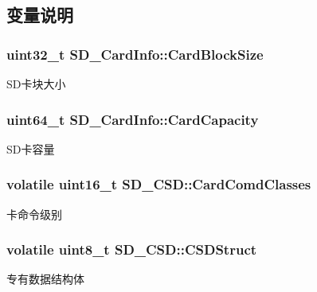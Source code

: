\subsection{变量说明}
\subsubsection[{\texorpdfstring{Card\+Block\+Size}{CardBlockSize}}]{\setlength{\rightskip}{0pt plus 5cm}uint32\+\_\+t S\+D\+\_\+\+Card\+Info\+::\+Card\+Block\+Size}\hypertarget{group__sd__card_ga610fdab86929f0fc26881d564b19d609}{}\label{group__sd__card_ga610fdab86929f0fc26881d564b19d609}
S\+D卡块大小 
\subsubsection[{\texorpdfstring{Card\+Capacity}{CardCapacity}}]{\setlength{\rightskip}{0pt plus 5cm}uint64\+\_\+t S\+D\+\_\+\+Card\+Info\+::\+Card\+Capacity}\hypertarget{group__sd__card_ga536fbe580a6c824e73a2c3c4cf5b40c6}{}\label{group__sd__card_ga536fbe580a6c824e73a2c3c4cf5b40c6}
S\+D卡容量 
\subsubsection[{\texorpdfstring{Card\+Comd\+Classes}{CardComdClasses}}]{\setlength{\rightskip}{0pt plus 5cm}volatile uint16\+\_\+t S\+D\+\_\+\+C\+S\+D\+::\+Card\+Comd\+Classes}\hypertarget{group__sd__card_ga2777d2837a2db0a106ce0a915253f24d}{}\label{group__sd__card_ga2777d2837a2db0a106ce0a915253f24d}
卡命令级别 
\subsubsection[{\texorpdfstring{C\+S\+D\+Struct}{CSDStruct}}]{\setlength{\rightskip}{0pt plus 5cm}volatile uint8\+\_\+t S\+D\+\_\+\+C\+S\+D\+::\+C\+S\+D\+Struct}\hypertarget{group__sd__card_ga700c48bc2c031e2b002dd551a1af154c}{}\label{group__sd__card_ga700c48bc2c031e2b002dd551a1af154c}
专有数据结构体 
